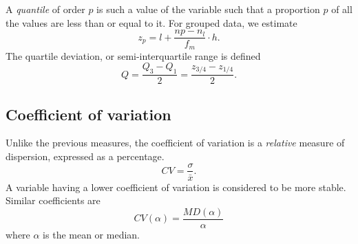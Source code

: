 \documentclass[11pt]{article}
\theoremstyle{definition}
\theoremstyle{remark}
\numberwithin{equation}{section}
\begin{document}
    A \emph{quantile} of order $p$ is such a value of the variable such that a
    proportion $p$ of all the values are less than or equal to it. For grouped data,
    we estimate \[
        z_p = l + \frac{np - n_l}{f_m}\cdot h.
    \] The quartile deviation, or semi-interquartile range is defined \[
        Q = \frac{Q_3 - Q_1}{2} = \frac{z_{3 / 4} - z_{1 / 4}}{2}.
    \] 


    \subsection{Coefficient of variation}

    Unlike the previous measures, the coefficient of variation is a \emph{relative}
    measure of dispersion, expressed as a percentage. \[
        CV = \frac{\sigma}{\bar{x}}.
    \] A variable having a lower coefficient of variation is considered to be more
    stable. Similar coefficients are \[
        CV(\alpha) = \frac{MD(\alpha)}{\alpha}
    \] where $\alpha$ is the mean or median.
\end{document}
